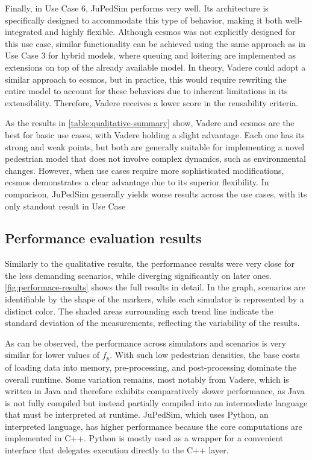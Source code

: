 \documentclass[twoside, 11pt]{article}
\begin{document}
Finally, in Use Case 6, JuPedSim performs very well. Its architecture is specifically designed to accommodate this type of behavior, making it both well-integrated and highly flexible. Although \gls{ecsmos} was not explicitly designed for this use case, similar functionality can be achieved using the same approach as in Use Case 3 for hybrid models, where queuing and loitering are implemented as extensions on top of the already available model. In theory, Vadere could adopt a similar approach to \gls{ecsmos}, but in practice, this would require rewriting the entire model to account for these behaviors due to inherent limitations in its extensibility. Therefore, Vadere receives a lower score in the reusability criteria.


As the results in \autoref{table:qualitative-summary} show, Vadere and \gls{ecsmos} are the best for basic use cases, with Vadere holding a slight advantage. Each one has its strong and weak points, but both are generally suitable for implementing a novel pedestrian model that does not involve complex dynamics, such as environmental changes. However, when use cases require more sophisticated modifications, \gls{ecsmos} demonstrates a clear advantage due to its superior flexibility. In comparison, JuPedSim generally yields worse results across the use cases, with its only standout result in Use Case


\subsection{Performance evaluation results}

Similarly to the qualitative results, the performance results were very close for the less demanding scenarios, while diverging significantly on later ones. \autoref{fig:performace-results} shows the full results in detail. In the graph, scenarios are identifiable by the shape of the markers, while each simulator is represented by a distinct color. The shaded areas surrounding each trend line indicate the standard deviation of the measurements, reflecting the variability of the results.

As can be observed, the performance across simulators and scenarios is very similar for lower values of $f_p$. With such low pedestrian densities, the base costs of loading data into memory, pre-processing, and post-processing dominate the overall runtime. Some variation remains, most notably from Vadere, which is written in Java and therefore exhibits comparatively slower performance, as Java is not fully compiled but instead partially compiled into an intermediate language that must be interpreted at runtime. JuPedSim, which uses Python, an interpreted language, has higher performance because the core computations are implemented in C++. Python is mostly used as a wrapper for a convenient interface that delegates execution directly to the C++ layer.
\end{document}
